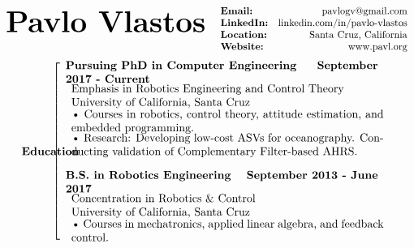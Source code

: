 \documentclass[paper=a4,fontsize=11pt]{article} %
\def \mainColWidth {0.8\textwidth}		%
\def \leftColWidth {0.05\textwidth}		%
\begin{document}
\begin{align*}
	\text{\fontsize{30}{36}\selectfont \textbf{Pavlo Vlastos}} & & \hfill \begin{array}{lr}
	\textbf{Email:} & \text{pavlogv@gmail.com}\\
	\textbf{LinkedIn:} & \text{linkedin.com/in/pavlo-vlastos}\\
	\textbf{Location:} & \text{Santa Cruz, California}\\
	\textbf{Website:} & \text{www.pavl.org}
	\end{array} 
\end{align*}
%
\begin{align*}
	&
	\parbox{\leftColWidth}{%
		\textbf{Education}
	}%
	&
	\left[\begin{array}{l}
		\parbox{\mainColWidth}{%
			\textbf{Pursuing PhD in Computer Engineering} \hfill \textbf{September 2017 - Current} 
		}%
		\\
		\begin{array}{l} 
			\text{Emphasis in Robotics Engineering and Control Theory}\\
			\text{University of California, Santa Cruz} \\
			\parbox{\mainColWidth}{%
				\textbullet\ Courses in robotics, control theory, attitude estimation, and embedded programming.
			}%
			\\
			\parbox{\mainColWidth}{%
				\textbullet\ Research: Developing low-cost ASVs for oceanography. Conducting validation of Complementary Filter-based AHRS.
			}%
		\end{array}\\
		\\
		\parbox{\mainColWidth}{%
			\textbf{B.S. in Robotics Engineering} \hfill \textbf{September 2013 - June 2017}
		}%
		\\
		\begin{array}{l}
			\text{Concentration in Robotics \& Control} \\
			\text{University of California, Santa Cruz} \\
			\parbox{\mainColWidth}{%
				\textbullet\ Courses in mechatronics, applied linear algebra, and feedback control.
			}%
		\end{array}
	\end{array}\right.\\

\end{align*}
\end{document}
